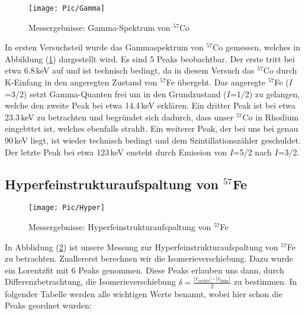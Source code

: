 \documentclass[10pt,twoside]{article}
\renewcommand{\1}{^{-1}}
\renewcommand{\2}{^{-2}}
\newcommand{\3}{^{-3}}
\newcommand{\4}{^{-4}}
\newcommand{\5}{^{-5}}
\newcommand{\6}{^{-6}}
\newcommand{\7}{^{-7}}
\newcommand{\8}{^{-8}}
\newcommand{\9}{^{-9}}
\begin{document}
\begin{figure}[H]
\centering
\texttt{[image: Pic/Gamma]}
\caption{Messergebnisse: Gamma-Spektrum von $^{57}$Co}
\label{Gamma}
\end{figure}

In ersten Versuchsteil wurde das Gammaspektrum von $^{57}$Co gemessen, welches in Abbildung (\ref{Gamma}) dargestellt wird. Es sind 5 Peaks beobachtbar. Der erste tritt bei etwa 6.8\,keV auf und ist technisch bedingt, da in diesem Versuch das $^{57}$Co durch K-Einfang in den angeregten Zustand von $^{57}$Fe übergeht. Das angeregte $^{57}$Fe ($I$=3/2) setzt Gamma-Quanten frei um in den Grundzustand ($I$=1/2) zu gelangen, welche den zweite Peak bei etwa 14.4\,keV erklären. Ein dritter Peak ist bei etwa 23.3\,keV zu betrachten und begründet sich dadurch, dass unser $^{57}$Co in Rhodium eingebttet ist, welches ebenfalls strahlt. Ein weiterer Peak, der bei uns bei genau 90\,keV liegt, ist wieder technisch bedingt und dem Szintillationszähler geschuldet. Der letzte Peak bei etwa 123\,keV ensteht durch Emission von $I$=5/2 nach 
$I$=3/2.

\newpage

\subsection{Hyperfeinstrukturaufspaltung von $^{57}$Fe}

\begin{figure}[H]
\centering
\texttt{[image: Pic/Hyper]}
\caption{Messergebnisse: Hyperfeinstrukturaufspaltung von $^{57}$Fe}
\label{Hyper}
\end{figure}

In Abblidung (\ref{Hyper}) ist unsere Messung zur Hyperfeinstrukturaufspaltung von $^{57}$Fe zu betrachten. Zuallererst berechnen wir die Isomerieverschiebung. Dazu wurde ein Lorentzfit mit 6 Peaks genommen. Diese Peaks erlauben uns dann, durch Differenzbetrachtung, die Isomerieverschiebung $\delta=\frac{\vert v_{\text{rechts}} \vert - \vert v_{\text{links}} \vert }{2}$ zu bestimmen. In folgender Tabelle werden alle wichtigen Werte benannt, wobei hier schon die Peaks geordnet wurden:
\end{document}
